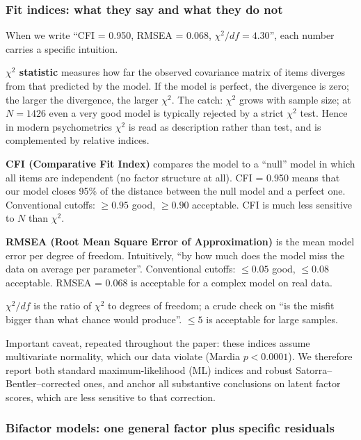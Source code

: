 \subsubsection{Fit indices: what they say and what they do not}

When we write ``CFI = 0.950, RMSEA = 0.068, $\chi^2/df = 4.30$'', each number carries a specific intuition.

\textbf{$\chi^2$ statistic} measures how far the observed covariance matrix of items diverges from that predicted by the model. If the model is perfect, the divergence is zero; the larger the divergence, the larger $\chi^2$. The catch: $\chi^2$ grows with sample size; at $N = 1426$ even a very good model is typically rejected by a strict $\chi^2$ test. Hence in modern psychometrics $\chi^2$ is read as description rather than test, and is complemented by relative indices.

\textbf{CFI (Comparative Fit Index)} compares the model to a ``null'' model in which all items are independent (no factor structure at all). CFI = 0.950 means that our model closes 95\% of the distance between the null model and a perfect one. Conventional cutoffs: $\geq 0.95$ good, $\geq 0.90$ acceptable. CFI is much less sensitive to $N$ than $\chi^2$.

\textbf{RMSEA (Root Mean Square Error of Approximation)} is the mean model error per degree of freedom. Intuitively, ``by how much does the model miss the data on average per parameter''. Conventional cutoffs: $\leq 0.05$ good, $\leq 0.08$ acceptable. RMSEA = 0.068 is acceptable for a complex model on real data.

\textbf{$\chi^2/df$} is the ratio of $\chi^2$ to degrees of freedom; a crude check on ``is the misfit bigger than what chance would produce''. $\leq 5$ is acceptable for large samples.

Important caveat, repeated throughout the paper: these indices assume multivariate normality, which our data violate (Mardia $p < 0.0001$). We therefore report both standard maximum-likelihood (ML) indices and robust Satorra--Bentler--corrected ones, and anchor all substantive conclusions on latent factor scores, which are less sensitive to that correction.

\subsubsection{Bifactor models: one general factor plus specific residuals}

